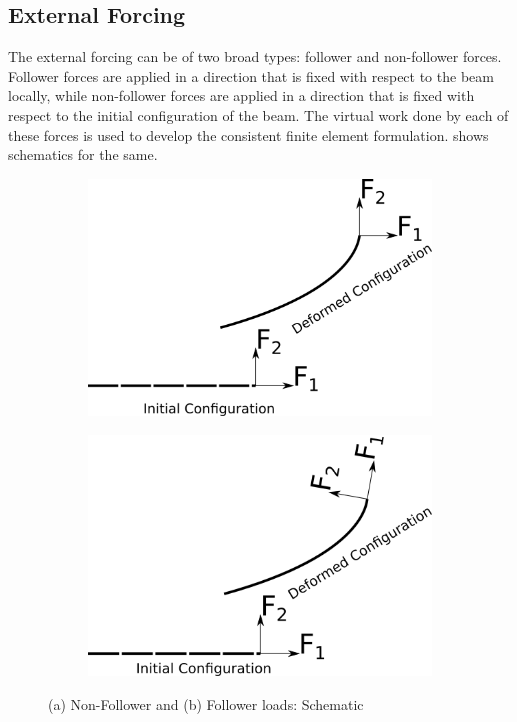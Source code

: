 \documentclass[10pt]{article}
\begin{document}
\subsection{External Forcing}
\label{sec:external-forcing}

The external forcing can be of two broad types: follower and
non-follower forces. Follower forces are applied in a direction that
is fixed with respect to the beam locally, while non-follower forces
are applied in a direction that is fixed with respect to the initial
configuration of the beam. The virtual work done by each of these
forces is used to develop the consistent finite element
formulation.  shows schematics for the same.

\begin{figure}[!h]
  \centering
  \begin{subfigure}[!h]{0.5\linewidth}
    \centering{}
    \includegraphics[width=\linewidth]{FIGS/nonfollowerload}
    \caption{}
  \end{subfigure}%
  \begin{subfigure}[!h]{0.5\linewidth}
    \centering{}
    \includegraphics[width=\linewidth]{FIGS/followerload}
    \caption{}
  \end{subfigure}  
  \caption{(a) Non-Follower and (b) Follower loads: Schematic}
  \label{fig:lds}
\end{figure}
\end{document}
